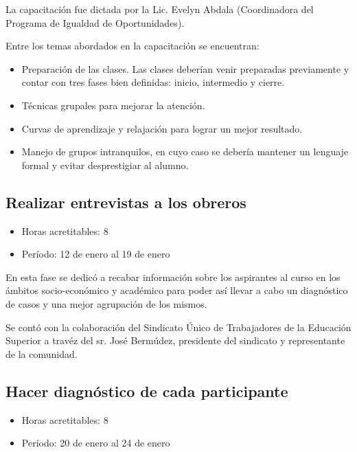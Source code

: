              La capacitación fue dictada por la Lic. Evelyn Abdala (Coordinadora del Programa de Igualdad de
             Oportunidades).
             
             Entre los temas abordados en la capacitación se encuentran:
             
             \begin{itemize}
                 \item Preparación de las clases. Las clases deberían venir preparadas previamente y contar con tres fases bien definidas: inicio, intermedio y cierre.
                 
                 \item Técnicas grupales para mejorar la atención.
                 
                 \item Curvas de aprendizaje y relajación para lograr un mejor resultado.
                 
                 \item Manejo de grupos intranquilos, en cuyo caso se debería mantener un lenguaje formal y evitar desprestigiar al alumno.
                 
                \end{itemize}
             
             \subsection {Realizar entrevistas a los obreros}
             \begin{itemize}
                 \item Horas acretitables: 8
                 \item Período: 12 de enero al 19 de enero
                \end{itemize}
             
             En esta fase se dedicó a recabar información sobre los aspirantes al curso en los ámbitos socio-económico y académico para poder así llevar a cabo un diagnóstico de casos y una mejor agrupación de los mismos.
             
             Se contó con la colaboración del Sindicato Único de Trabajadores de la Educación Superior a travéz del sr. José Bermúdez, presidente del sindicato y representante de la comunidad.
             
             \subsection {Hacer diagnóstico de cada participante}
             \begin{itemize}
                 \item Horas acretitables: 8
                 \item Período: 20 de enero al 24 de enero
                \end{itemize}
                
